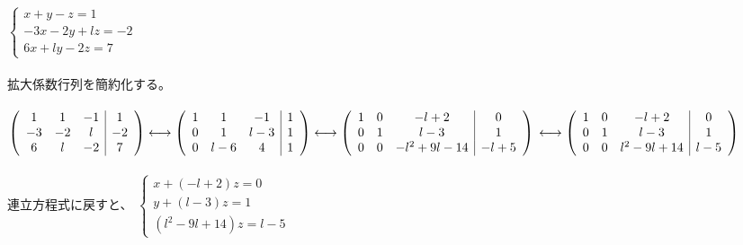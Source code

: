 \documentclass[fleqn]{jsarticle}
\begin{document}
    $ \left\{
        \begin{array}{l}
            x + y - z = 1 \\
            -3x - 2y + lz = -2 \\
            6x + ly - 2z = 7
        \end{array}
    \right. $ \\\\
    拡大係数行列を簡約化する。\\\\
        $ \left(
            \begin{array}{ccc|c}
                1 & 1 & -1 & 1 \\
                -3 & -2 & l & -2 \\
                6 & l & -2 & 7
            \end{array}
        \right)
        \longleftrightarrow
        \left(
            \begin{array}{ccc|c}
                1 & 1 & -1 & 1 \\
                0 & 1 & l-3 & 1 \\
                0 & l-6 & 4 & 1
            \end{array}
        \right)
        \longleftrightarrow
        \left(
            \begin{array}{ccc|c}
                1 & 0 & -l+2 & 0 \\
                0 & 1 & l-3 & 1 \\
                0 & 0 & -l^2+9l-14 & -l+5
            \end{array}
        \right) \\\\
        \longleftrightarrow
        \left(
            \begin{array}{ccc|c}
                1 & 0 & -l+2 & 0 \\
                0 & 1 & l-3 & 1 \\
                0 & 0 & l^2-9l+14 & l-5
            \end{array}
        \right) $ \\\\
        連立方程式に戻すと、
        $ \left\{
            \begin{array}{l}
                x + (-l + 2)z = 0 \\
                y + (l - 3)z = 1 \\
                (l^2-9l+14)z = l - 5
            \end{array}
        \right. $
\end{document}
